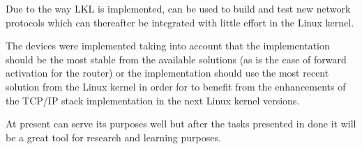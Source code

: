 Due to the way LKL is implemented, \project can be used to build and test new network protocols which can thereafter be integrated with little effort in the Linux kernel.

The \project devices were implemented taking into account that the implementation should be the most stable from 
the available solutions (as is the case of forward activation for the router) or the implementation should use the 
most recent solution from the Linux kernel in order for \project to benefit from the enhancements of the TCP/IP stack 
implementation in the next Linux kernel versions.

At present \project can serve its purposes well but after the tasks presented in  done it will be a 
great tool for research and learning purposes. 
